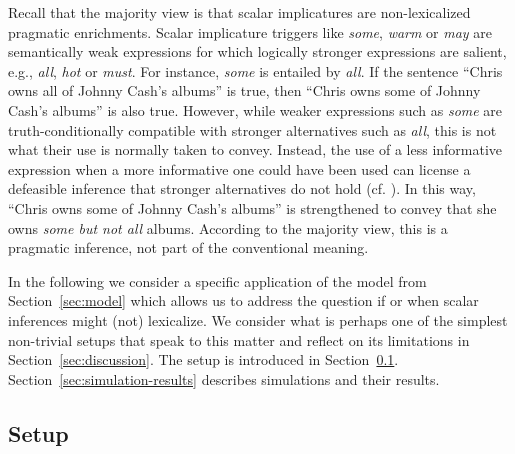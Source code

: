 \documentclass[a4paper, 11pt]{article}
\theoremstyle{Satz}
\begin{document}
Recall that the majority view is that scalar implicatures are non-lexicalized pragmatic
enrichments. Scalar implicature triggers like \emph{some}, \emph{warm} or \emph{may} are
semantically weak expressions for which logically stronger expressions are salient, e.g.,
\emph{all}, \emph{hot} or \emph{must}. For instance, {\em some} is entailed by {\em all}. If
the sentence ``Chris owns all of Johnny Cash's albums'' is true, then ``Chris owns some of
Johnny Cash's albums'' is also true. However, while weaker expressions such as {\em some} are
truth-conditionally compatible with stronger alternatives such as {\em all}, this is not what
their use is normally taken to convey. Instead, the use of a less informative expression when a
more informative one could have been used can license a defeasible inference that stronger
alternatives do not hold (cf. \citealt{horn:1972,gazdar:1979}). In this way, ``Chris owns some
of Johnny Cash's albums'' is strengthened to convey that she owns {\em some but not all}
albums. According to the majority view, this is a pragmatic inference, not part of the
conventional meaning.

In the following we consider a specific application of the model from Section~\ref{sec:model}
which allows us to address the question if or when scalar inferences might (not) lexicalize. We
consider what is perhaps one of the simplest non-trivial setups that speak to this matter and
reflect on its limitations in Section~\ref{sec:discussion}. The setup is introduced in
Section~\ref{sec:setup:-stat-conc}. Section~\ref{sec:simulation-results} describes simulations
and their results.



\subsection{Setup}
\label{sec:setup:-stat-conc}
\end{document}
